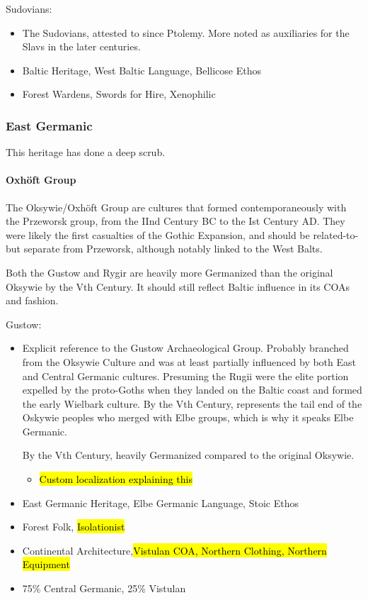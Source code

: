 \documentclass{article}
\begin{document}
	Sudovians:
	\begin{itemize}
		\item The Sudovians, attested to since Ptolemy. More noted as auxiliaries for the Slavs in the later centuries.
		\item Baltic Heritage, West Baltic Language, Bellicose Ethos
		\item Forest Wardens, Swords for Hire, Xenophilic
	\end{itemize}
	
	\subsubsection{East Germanic}
	This heritage has done a deep scrub.
	
	\paragraph{Oxhöft Group}
	The Oksywie/Oxhöft Group are cultures that formed contemporaneously with the Przeworsk group, from the IInd Century BC to the Ist Century AD.
	They were likely the first casualties of the Gothic Expansion, and should be related-to-but separate from Przeworsk, although notably linked to the West Balts.
	
	Both the Gustow and Rygir are heavily more Germanized than the original Oksywie by the Vth Century. It should still reflect Baltic influence in its COAs and fashion.
	
	Gustow:
	\begin{itemize}
		\item Explicit reference to the Gustow Archaeological Group.
		Probably branched from the Oksywie Culture and was at least partially influenced by both East and Central Germanic cultures.
		Presuming the Rugii were the elite portion expelled by the proto-Goths when they landed on the Baltic coast and formed the early Wielbark culture.
		By the Vth Century, represents the tail end of the Oskywie peoples who merged with Elbe groups, which is why it speaks Elbe Germanic.
		
		By the Vth Century, heavily Germanized compared to the original Oksywie.
		\begin{itemize}
			\item \hl{Custom localization explaining this}
		\end{itemize}
		\item East Germanic Heritage, Elbe Germanic Language, Stoic Ethos
		\item Forest Folk, \hl{Isolationist}
		\item Continental Architecture,\hl{Vistulan COA, Northern Clothing, Northern Equipment}
		\item 75\% Central Germanic, 25\% Vistulan
	\end{itemize}
	
\end{document}
